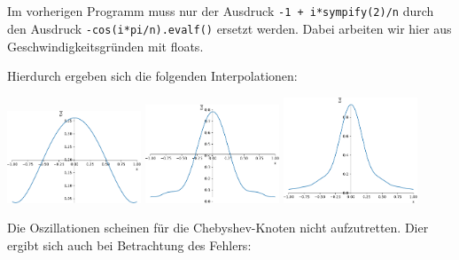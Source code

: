 \section{}

Im vorherigen Programm muss nur der Ausdruck \texttt{-1 + i*sympify(2)/n} durch den Ausdruck \texttt{-cos(i*pi/n).evalf()} ersetzt werden.
Dabei arbeiten wir hier aus Geschwindigkeitsgründen mit floats.

Hierdurch ergeben sich die folgenden Interpolationen:

\begin{center}
  \includegraphics[width = 0.3\textwidth]{chapter_09/exercise_09_48_figure_1.pdf}
  \hspace{1em}
  \includegraphics[width = 0.3\textwidth]{chapter_09/exercise_09_48_figure_2.pdf}
  \hspace{1em}
  \includegraphics[width = 0.3\textwidth]{chapter_09/exercise_09_48_figure_3.pdf}
\end{center}

Die Oszillationen scheinen für die Chebyshev-Knoten nicht aufzutretten.
Dier ergibt sich auch bei Betrachtung des Fehlers:

